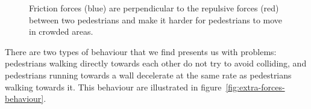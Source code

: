 \begin{figure}[hb]
    \centering
    \caption[Friction forces]{Friction forces (blue) are perpendicular to the 
    repulsive forces (red) between two pedestrians and make it harder for 
    pedestrians to move in crowded areas.}
    \label{fig:friction}
\end{figure}

There are two types of behaviour that we find presents us with problems: 
pedestrians walking directly towards each other do not try to avoid colliding, 
and pedestrians running towards a wall decelerate at the same rate as 
pedestrians walking towards it. This behaviour are illustrated in 
figure~\ref{fig:extra-forces-behaviour}.

